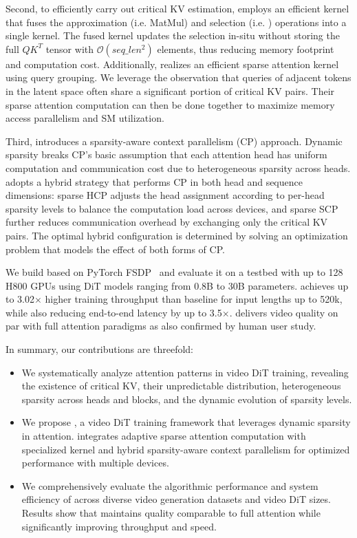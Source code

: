Second, to efficiently carry out critical KV estimation, \sys employs an efficient kernel that fuses the approximation (i.e. MatMul) and selection (i.e. \topk) operations into a single kernel.
The fused kernel updates the \topk selection in-situ without storing the full $QK^T$ tensor with $\mathcal{O}(seq\_len^{2})$ elements, thus reducing memory footprint and computation cost.
Additionally, \sys realizes an efficient sparse attention kernel using query grouping. 
We leverage the observation that queries of adjacent tokens in the latent space often share a significant portion of critical KV pairs.
Their sparse attention computation can then be done together to maximize memory access parallelism and SM utilization.

Third, \sys introduces a sparsity-aware context parallelism (CP) approach. 
Dynamic sparsity breaks CP's basic assumption that each attention head has uniform computation and communication cost due to heterogeneous sparsity across heads. 
\sys adopts a hybrid strategy that performs CP in both head and sequence dimensions: sparse HCP adjusts the head assignment according to per-head sparsity levels to balance the computation load across devices, and sparse SCP further reduces communication overhead by exchanging only the critical KV pairs.
The optimal hybrid configuration is determined by solving an optimization problem that models the effect of both forms of CP.

We build \sys based on PyTorch FSDP~\cite{zhao2023pytorchfsdp} and evaluate it on a testbed with up to 128 H800 GPUs using DiT models ranging from 0.8B to 30B parameters. \sys achieves up to 3.02$\times$ higher training throughput than baseline for input lengths up to 520k, while also reducing end-to-end latency by up to 3.5$\times$. \sys delivers video quality on par with full attention paradigms as also confirmed by human user study.

In summary, our contributions are threefold:

\begin{itemize}[leftmargin=*]
    \item We systematically analyze attention patterns in video DiT training, revealing the existence of critical KV, their unpredictable distribution, heterogeneous sparsity across heads and blocks, and the dynamic evolution of sparsity levels.
    
    \item We propose \sys, a video DiT training framework that leverages dynamic sparsity in attention. \sys integrates adaptive sparse attention computation with specialized kernel and hybrid sparsity-aware context parallelism for optimized performance with multiple devices.
    
    \item We comprehensively evaluate the algorithmic performance and system efficiency of \sys across diverse video generation datasets and video DiT sizes. Results show that \sys maintains quality comparable to full attention while significantly improving throughput and speed.
    
\end{itemize}
